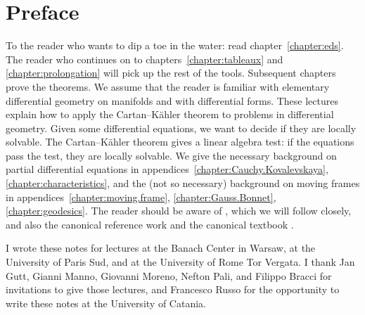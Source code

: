\chapter*{Preface}
To the reader who wants to dip a toe in the water: read chapter~\ref{chapter:eds}.
The reader who continues on to chapters~\ref{chapter:tableaux} and \ref{chapter:prolongation} will pick up the rest of the tools.
Subsequent chapters prove the theorems.
We assume that the reader is familiar with elementary differential geometry on manifolds and with differential forms.
These lectures explain how to apply the Cartan--K\"ahler theorem to problems in differential geometry.
Given some differential equations, we want to decide if they are locally solvable.
The Cartan--K\"ahler theorem gives a linear algebra test: if the equations pass the test, they are locally solvable.
We give the necessary background on partial differential equations in appendices~\ref{chapter:Cauchy.Kovalevskaya}, \ref{chapter:characteristics}, and the (not so necessary) background on moving frames in appendices~\ref{chapter:moving.frame}, \ref{chapter:Gauss.Bonnet}, \ref{chapter:geodesics}.
The reader should be aware of \cite{Cartan:1945}, which we will follow closely, and also the canonical reference work \cite{BCGGG:1991} and the canonical textbook \cite{Ivey/Landsberg:2003}.

I wrote these notes for lectures at the Banach Center in Warsaw, at the University of Paris Sud, and at the University of Rome Tor Vergata.
I thank Jan Gutt, Gianni Manno, Giovanni Moreno, Nefton Pali, and Filippo Bracci for invitations to give those lectures, and Francesco Russo for the opportunity to write these notes at the University of Catania.
 